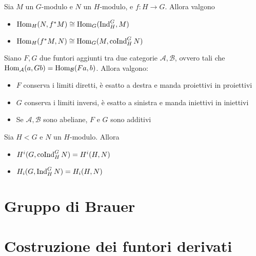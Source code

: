 \begin{proposition}
    Sia $M$ un $G$-modulo e $N$ un $H$-modulo, e $f:H\to G$. Allora valgono
    \begin{itemize}
        \item $\operatorname{Hom}_H(N,f^\ast M)\cong\operatorname{Hom}_G(\operatorname{Ind}_H^G,M)$
        \item $\operatorname{Hom}_H(f^\ast M, N)\cong\operatorname{Hom}_G(M,\operatorname{coInd}_H^G N)$
    \end{itemize}
\end{proposition}

\begin{proposition}
    Siano $F,G$ due funtori aggiunti tra due categorie $\mathcal A,\mathcal B$, ovvero tali che $\operatorname{Hom}_{\mathcal A}(a,Gb)=\operatorname{Hom}_{\mathcal B}(Fa,b)$. Allora valgono:
    \begin{itemize}
        \item $F$ conserva i limiti diretti, è esatto a destra e manda proiettivi in proiettivi
        \item $G$ conserva i limiti inversi, è esatto a sinistra e manda iniettivi in iniettivi
        \item Se $\mathcal A,\mathcal B$ sono abeliane, $F$ e $G$ sono additivi
    \end{itemize}
\end{proposition}

\begin{theorem}
    Sia $H<G$ e $N$ un $H$-modulo. Allora
    \begin{itemize}
        \item $H^i(G,\operatorname{coInd}_H^G N)=H^i(H,N)$
        \item $H_i(G,\operatorname{Ind}_H^G N)=H_i(H,N)$
    \end{itemize}
\end{theorem}


\section{Gruppo di Brauer}

\section{Costruzione dei funtori derivati}